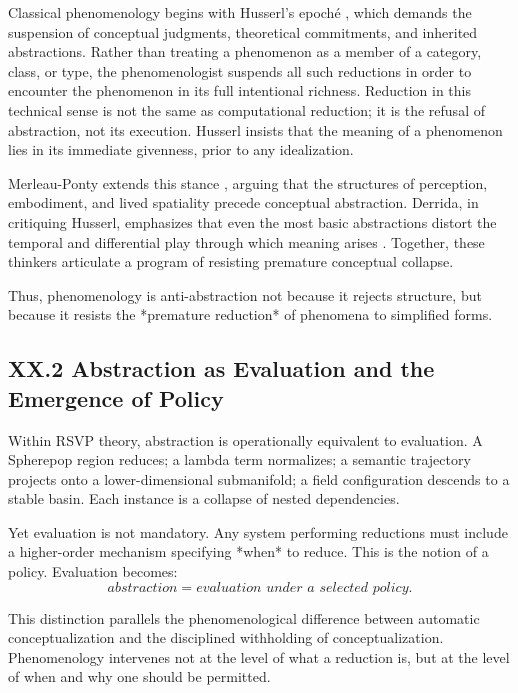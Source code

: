 \documentclass[12pt,letterpaper]{article}
\begin{document}
Classical phenomenology begins with Husserl's epoché
\cite{Husserl1913,Husserl1931,Husserl1954}, which demands the suspension of
conceptual judgments, theoretical commitments, and inherited abstractions.
Rather than treating a phenomenon as a member of a category, class, or type, the
phenomenologist suspends all such reductions in order to encounter the phenomenon
in its full intentional richness.  Reduction in this technical sense is not the
same as computational reduction; it is the refusal of abstraction, not its
execution.  Husserl insists that the meaning of a phenomenon lies in its
immediate givenness, prior to any idealization.

Merleau-Ponty extends this stance \cite{MerleauPonty1945}, arguing that the
structures of perception, embodiment, and lived spatiality precede conceptual
abstraction.  Derrida, in critiquing Husserl, emphasizes that even the most
basic abstractions distort the temporal and differential play through which
meaning arises \cite{Derrida1967}.  Together, these thinkers articulate a
program of resisting premature conceptual collapse.

Thus, phenomenology is anti-abstraction not because it rejects structure, but
because it resists the *premature reduction* of phenomena to simplified forms.

\subsection{XX.2 Abstraction as Evaluation and the Emergence of Policy}

Within RSVP theory, abstraction is operationally equivalent to evaluation.  A
Spherepop region reduces; a lambda term normalizes; a semantic trajectory
projects onto a lower-dimensional submanifold; a field configuration descends to
a stable basin.  Each instance is a collapse of nested dependencies.

Yet evaluation is not mandatory.  Any system performing reductions must include
a higher-order mechanism specifying *when* to reduce.  This is the notion of a
policy.  Evaluation becomes:
\[
\textit{abstraction} = \textit{evaluation under a selected policy}.
\]

This distinction parallels the phenomenological difference between automatic
conceptualization and the disciplined withholding of conceptualization.
Phenomenology intervenes not at the level of what a reduction is, but at the
level of when and why one should be permitted.
\end{document}
